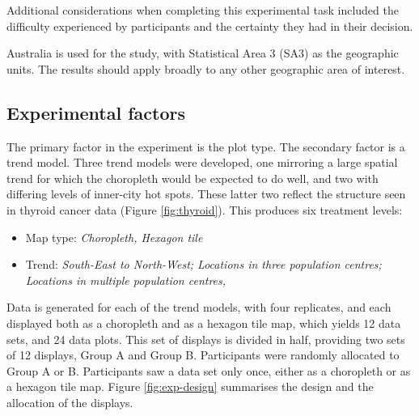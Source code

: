 \documentclass[times, doublespace]{anzsauth}
\begin{document}
Additional considerations when completing this experimental task
included the difficulty experienced by participants and the certainty
they had in their decision.

Australia is used for the study, with Statistical Area 3 (SA3)
\citep{abs2016} as the geographic units. The results
should apply broadly to any other geographic area of interest.

\subsection{Experimental factors}\label{experimental-factors}

The primary factor in the experiment is the plot type. The secondary
factor is a trend model. Three trend models were developed, one
mirroring a large spatial trend for which the choropleth would be
expected to do well, and two with differing levels of inner-city hot
spots. These latter two reflect the structure seen in thyroid cancer
data (Figure \ref{fig:thyroid}). This
produces six treatment levels:

\begin{itemize}
 \item
  Map type: \emph{Choropleth, Hexagon tile}
\item
  Trend: \emph{South-East to North-West; Locations in three population
  centres; Locations in multiple population centres, }
\end{itemize}

Data is generated for each of the trend models, with four replicates,
and each displayed both as a choropleth and as a hexagon tile map, which
yields 12 data sets, and 24 data plots. This set of displays is divided
in half, providing two sets of 12 displays, Group A and Group B.
Participants were randomly allocated to Group A or B. Participants saw a
data set only once, either as a choropleth or as a hexagon tile map.
Figure \ref{fig:exp-design} summarises the design and the allocation of
the displays.
\end{document}
